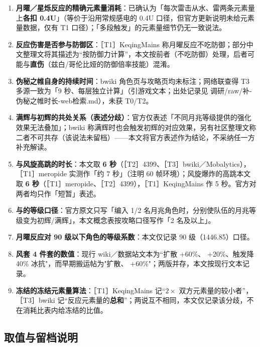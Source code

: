 \begin{enumerate}
\item \textbf{月曜／星烁反应的精确元素量消耗}：已确认为「每次雷击从水、雷两条元素量上\textbf{各扣 0.4U}」（等价于沿用常规感电的 0.4U 口径，但官方更新说明未给元素量数据，仅有 T1 口径）；「多段触发」的元素量细节仍无一致说法。
\item \textbf{反应伤害是否参与防御区}：［T1］KeqingMains 称月曜反应不吃防御；部分中文整理文将其描述为“按防御力计算”，本文按前者（不吃防御）处理，后者可能与\textbf{直伤}（兹白/哥伦比娅的防御倍率技能）混淆。
\item \textbf{伪秘之帷自身的持续时间}：bwiki 角色页与攻略页均未标注；网络联查得 T3 多源一致为「9 秒、每层独立计算」（引游戏文本；出处记录见 调研/raw/补-伪秘之帷时长-web检索.md），未获 T0/T2。
\item \textbf{满辉与初辉的共处关系（表述分歧）}：官方仅表述「不同月兆等级提供的强化效果无法叠加」；bwiki 称满辉时也会触发初辉的对应效果，另有社区整理文称二者不可共存（该说法未留档）——本文将官方表述作为结论，不采纳任一方补充解读。
\item \textbf{与风旋高跳的时长}：本文取 \textbf{6 秒}（［T2］4399、［T3］bwiki／Mobalytics），［T1］meropide 实测作「约 7 秒」（注明 60 帧环境）；风旋爆炸的高跳本文取 \textbf{6 秒}（［T1］meropide、［T2］4399），［T1］KeqingMains 作 5 秒。官方对两者均只作「短暂」表述。
\item \textbf{与的等级口径}：官方原文只写「编入 1/2 名月兆角色时，分别使队伍的月兆等级变为初辉/满辉」，本文概念表按攻略口径写作「2 名及以上」。
\item \textbf{月曜反应对 90 级以下角色的等级系数}：本文仅记录 90 级（1446.85）口径。
\item \textbf{风套 4 件套的数值}：现行 wiki／数据站文本为“扩散 +60\%、 +20\%、触发降 40\% 冰抗"，而早期搬运帖为"扩散、 +60\%"；两版并存，本文按现行文本记录。
\item \textbf{冻结的\textbf{冻结元素量}算法}：［T1］KeqingMains 记“$2\times$ 双方元素量的较小者”，［T3］bwiki 记“反应元素量的\textbf{总和}”；两说互不相同，本文仅记录该分歧，不在消耗比表内给冻结的比值。
\end{enumerate}

\subsection{取值与留档说明}\label{sec:notes}

